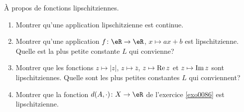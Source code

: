 
\begin{exercice}\label{exo0087}

	À propos de fonctions lipschitziennes.
	\begin{enumerate}
		\item
		      Montrer qu'une application lipschitzienne est continue.

		\item
		      Montrer qu'une application $f \colon \eR \to \eR$, $x \mapsto ax+b$ est lipschitzienne.  Quelle est la plus petite constante $L$ qui convienne?

		\item
		      Montrer que les fonctions $z \mapsto |z|$, $z \mapsto \overline z$, $z \mapsto {\rm Re\,} z$ et $z \mapsto {\rm Im\,} z$ sont lipschitziennes.  Quelle sont les plus petites constantes $L$ qui conviennent?

		\item
		      Montrer que la fonction $d(A,\cdot)\colon X \to \eR$ de l'exercice \ref{exo0086} est lipschitzienne.

	\end{enumerate}

\end{exercice}
